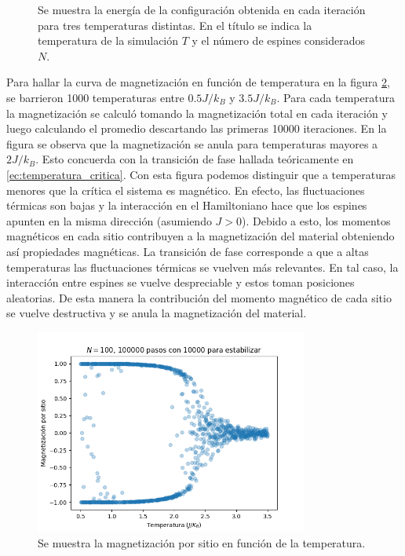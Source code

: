\documentclass{article}
\begin{document}
\begin{figure}
\begin{subfigure}{0.65\textwidth}
\end{subfigure}
\caption{\label{fig:energias}Se muestra la energía de la configuración obtenida en cada iteración para tres temperaturas distintas. En el título se indica la temperatura de la simulación $T$ y el número de espines considerados $N$.}
\end{figure}

Para hallar la curva de magnetización en función de temperatura en la figura \ref{fig:magnetizacion}, se barrieron 1000 temperaturas entre $0.5J/k_B$ y $3.5J/k_B$. Para cada temperatura la magnetización se calculó tomando la magnetización total en cada iteración y luego calculando el promedio descartando las primeras 10000 iteraciones. En la figura se observa que la magnetización se anula para temperaturas mayores a $2J/k_B$. Esto concuerda con la transición de fase hallada teóricamente en \eqref{ec:temperatura_critica}. Con esta figura podemos distinguir que a temperaturas menores que la crítica el sistema es magnético. En efecto, las fluctuaciones térmicas son bajas y la interacción en el Hamiltoniano hace que los espines apunten en la misma dirección (asumiendo $J>0$). Debido a esto, los momentos magnéticos en cada sitio contribuyen a la magnetización del material obteniendo así propiedades magnéticas. La transición de fase corresponde a que a altas temperaturas las fluctuaciones térmicas se vuelven más relevantes. En tal caso, la interacción entre espines se vuelve despreciable y estos toman posiciones aleatorias. De esta manera la contribución del momento magnético de cada sitio se vuelve destructiva y se anula la magnetización del material. 

\begin{figure}
\centering
\includegraphics[width = 0.8\textwidth]{magnetizacion.png}
\caption{\label{fig:magnetizacion}Se muestra la magnetización por sitio en función de la temperatura.}
\end{figure}
\end{document}
